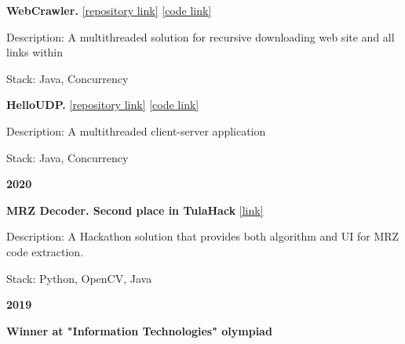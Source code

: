 \documentclass[11pt,a4paper]{report}
\begin{document}
\vspace{10px}

\hspace{10px} \textbf{WebCrawler.} \href{https://github.com/Kvel4/java-advanced}{[repository link]} \href{https://github.com/Kvel4/java-advanced/tree/master/java-solutions/info/kgeorgiy/ja/monakhov/crawler}{[code link]}

\hspace{20px} Description: A multithreaded solution for recursive downloading web site and all links within

\hspace{20px} Stack: Java, Concurrency

\vspace{10px}

\hspace{10px} \textbf{HelloUDP.} \href{https://github.com/Kvel4/java-advanced}{[repository link]} \href{https://github.com/Kvel4/java-advanced/tree/master/java-solutions/info/kgeorgiy/ja/monakhov/hello}{[code link]}

\hspace{20px} Description: A multithreaded client-server application

\hspace{20px} Stack: Java, Concurrency

\vspace{10px}




\textbf{\Large{2020}}

\hspace{10px} \textbf{MRZ Decoder. Second place in TulaHack} \href{https://github.com/Kvel4/MRZ_codes}{[link]}

\hspace{20px} Description: A Hackathon solution that provides both algorithm and UI for
MRZ code extraction.
 
\hspace{20px} Stack: Python, OpenCV, Java
\vspace{10px}



\textbf{\Large{2019}}

\hspace{10px} \textbf{Winner at "Information Technologies" olympiad}
\end{document}
